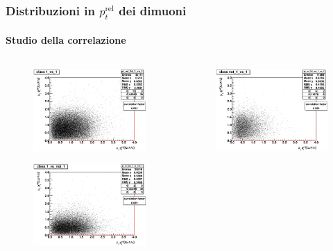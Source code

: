 \documentclass[italian]{beamer}
\newcommand{\ptrel}{\ensuremath{p_{t}^{\text{rel}}}}
\begin{document}
\begin{frame}
    \frametitle{Distribuzioni in \ptrel{} dei dimuoni}
    \framesubtitle{Studio della correlazione}
    \begin{columns}
        \begin{column}{.5\textwidth}
            \begin{figure}[h]
                \centering
                \includegraphics[width=.7\textwidth]{pt_rel_2d_1_vs_1.eps}
            \end{figure}
            \begin{figure}[h]
                \centering
                \includegraphics[width=.7\textwidth]{pt_rel_2d_1_vs_not_1.eps}
            \end{figure}
        \end{column}
        \begin{column}{.5\textwidth}
            \begin{figure}[h]
                \centering
                \includegraphics[width=.7\textwidth]{pt_rel_2d_not_1_vs_1.eps}

\end{figure}
\end{column}
\end{columns}
\end{frame}
\end{document}
